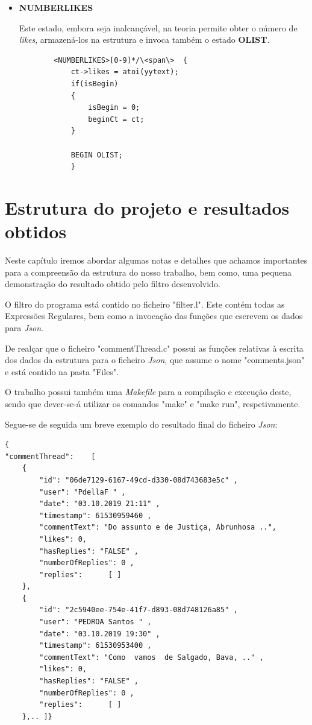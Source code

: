 \documentclass[a4paper,12pt]{report}
\begin{document}
\begin{itemize}
    \item 
    \textbf{NUMBERLIKES}
    \par Este estado, embora seja inalcançável, na teoria permite obter o número de \textit{likes}, armazená-los na estrutura e invoca também o estado \textbf{OLIST}.
    
    \begin{verbatim}
        <NUMBERLIKES>[0-9]*/\<span\>  {
            ct->likes = atoi(yytext);
            if(isBegin)
            {
                isBegin = 0;
                beginCt = ct;
            }

            BEGIN OLIST;
            }
    \end{verbatim}
    
\end{itemize}

\chapter{Estrutura do projeto e resultados obtidos}

\par Neste capítulo iremos abordar algumas notas e detalhes que achamos importantes para a compreensão da estrutura do nosso trabalho, bem como, uma pequena demonstração do resultado obtido pelo filtro desenvolvido.

\par O filtro do programa está contido no ficheiro "filter.l". Este contém todas as Expressões Regulares, bem como a invocação das funções que escrevem os dados para \textit{Json}.
\par De realçar que o ficheiro "commentThread.c" possui as funções relativas à escrita dos dados da estrutura para o ficheiro \textit{Json}, que assume o nome "comments.json" e está contido na pasta "Files".
\par O trabalho possui também uma \textit{Makefile} para a compilação e execução deste, sendo que dever-se-á utilizar os comandos "make" e "make run", respetivamente.

Segue-se de seguida um breve exemplo do resultado final do ficheiro \textit{Json}:

\begin{verbatim}
{
"commentThread":	[
	{
		"id": "06de7129-6167-49cd-d330-08d743683e5c" ,
		"user": "PdellaF " ,
		"date": "03.10.2019 21:11" ,
		"timestamp": 61530959460 ,
		"commentText": "Do assunto e de Justiça, Abrunhosa ..",
		"likes": 0,
		"hasReplies": "FALSE" ,
		"numberOfReplies": 0 ,
		"replies":		[ ]
	},
	{
		"id": "2c5940ee-754e-41f7-d893-08d748126a85" ,
		"user": "PEDROA Santos " ,
		"date": "03.10.2019 19:30" ,
		"timestamp": 61530953400 ,
		"commentText": "Como  vamos  de Salgado, Bava, .." ,
		"likes": 0,
		"hasReplies": "FALSE" ,
		"numberOfReplies": 0 ,
		"replies":		[ ]
	},.. ]}
\end{verbatim}{}
\end{document}
